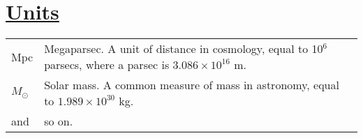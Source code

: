 \section*{\underline{Units}}

\begin{tabular}{ll}
Mpc & Megaparsec. A unit of distance in cosmology, equal to 10$^6$ parsecs, where a parsec is $3.086 \times 10^{16}$ m. \\
$M_{\odot}$ & Solar mass. A common measure of mass in astronomy, equal to $1.989 \times 10^{30}$ kg. \\
and & so on. \\
\end{tabular}




% 
